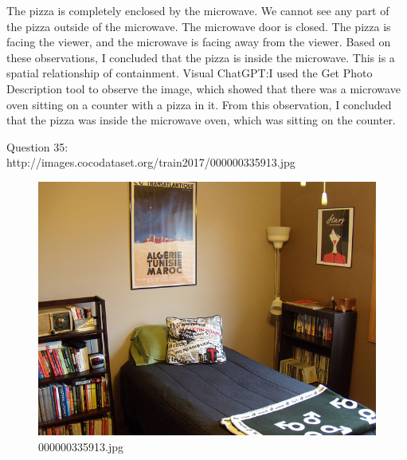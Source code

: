 \begin{enumerate}
        The pizza is completely enclosed by the microwave.
        We cannot see any part of the pizza outside of the microwave.
        The microwave door is closed.
        The pizza is facing the viewer, and the microwave is facing away from the viewer.
        Based on these observations, I concluded that the pizza is inside the microwave. This is a spatial relationship of containment.
        \subitem Visual ChatGPT:I used the Get Photo Description tool to observe the image, which showed that there was a microwave oven sitting on a counter with a pizza in it. From this observation, I concluded that the pizza was inside the microwave oven, which was sitting on the counter.
    \end{enumerate}
    Question 35:\\http://images.cocodataset.org/train2017/000000335913.jpg
    \begin{figure}[h]
        \centering
        \includegraphics[width=0.8\linewidth]{../image set/easy/000000335913.jpg}
        \caption{000000335913.jpg}
    \end{figure}
